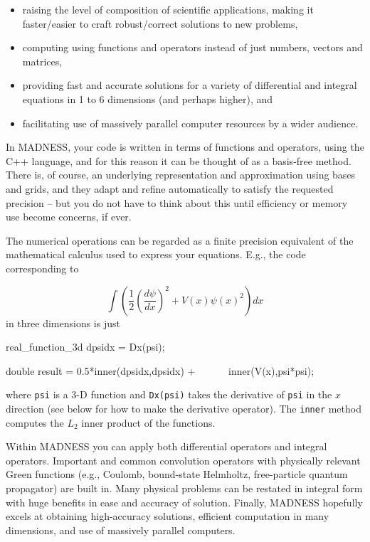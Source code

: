 \documentclass[letterpaper]{article}
\newcommand\liststyleLi{%
\renewcommand\labelitemi{{\textbullet}}
\renewcommand\labelitemii{${\circ}$}
\renewcommand\labelitemiii{${\blacksquare}$}
\renewcommand\labelitemiv{{\textbullet}}
}
\begin{document}
\liststyleLi
\begin{itemize}
\item raising the level of composition of scientific applications, making it faster/easier to craft robust/correct
solutions to new problems,
\item computing using functions and operators instead of just numbers, vectors and matrices,
\item providing fast and accurate solutions for a variety of differential and integral equations in 1 to 6 dimensions
(and perhaps higher), and
\item facilitating use of massively parallel computer resources by a wider audience.
\end{itemize}
In MADNESS, your code is written in terms of functions and operators, using the C++ language, and for this reason it can
be thought of as a basis-free method. There is, of course, an underlying representation and approximation using bases
and grids, and they adapt and refine automatically to satisfy the requested precision -- but you do not have to think
about this until efficiency or memory use become concerns, if ever.

The numerical operations can be regarded as a finite precision equivalent of the mathematical calculus used to express
your equations. E.g., the code corresponding to 

\begin{equation}
\int \left(\frac{1}{2}\left(\frac{d\psi }{dx}\right)^{2}+V(x)\psi (x)^{2}\right)\mathit{dx}
\end{equation}
in three dimensions is just

{\ttfamily
real\_function\_3d dpsidx = Dx(psi);}

{\ttfamily
double result = 0.5*inner(dpsidx,dpsidx) + \ \ \ \ \ \ inner(V(x),psi*psi);}

where \texttt{psi} is a 3-D function and \texttt{Dx(psi)} takes the derivative of \texttt{psi} in the  $x$ direction
(see below for how to make the derivative operator). The \texttt{inner} method computes the  $L_{2}$ inner product of
the functions.

Within MADNESS you can apply both differential operators and integral operators. Important and common convolution
operators with physically relevant Green functions (e.g., Coulomb, bound-state Helmholtz, free-particle quantum
propagator) are built in. Many physical problems can be restated in integral form with huge benefits in ease and
accuracy of solution. Finally, MADNESS hopefully excels at obtaining high-accuracy solutions, efficient computation in
many dimensions, and use of massively parallel computers.
\end{document}
